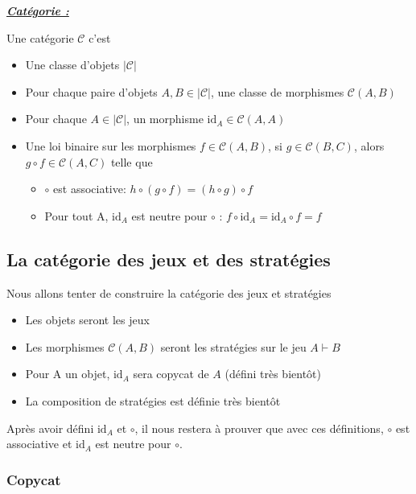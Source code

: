 \documentclass[a4paper,12ptCOUCOU
]{article}
\newlength{\mydepth}
\newlength{\myheight}
\newenvironment{answer}[1]
{\vspace{0.5cm}\begin{minipage}{\linewidth}\textbf{\textit{\underline{#1}}}\par\begin{lrbox}{\mybox}\quad\begin{minipage}{\linewidth}\color{black}\setlength{\parskip}{10pt}}
{\end{minipage}\end{lrbox}
\settodepth{\mydepth}{\usebox{\mybox}}
\settoheight{\myheight}{\usebox{\mybox}}
\addtolength{\myheight}{\mydepth}
\noindent\makebox[0pt]{
  \color{gray}\hspace{-0pt}\rule[-\mydepth]{1pt}{\myheight}}
\usebox{\mybox}
\end{minipage}
  }
\begin{document}
\begin{answer}{Catégorie :}
Une catégorie $\mathcal{C}$ c'est
\begin{itemize}
\item Une classe d'objets $|\mathcal{C}|$

\item Pour chaque paire d'objets $A, B \in |\mathcal{C}|$, une classe de
morphismes $\mathcal{C}(A,B)$

\item Pour chaque $A \in |\mathcal{C}|$, un morphisme
$\text{id}_A \in \mathcal{C}(A,A)$

\item Une loi binaire sur les morphismes
$f \in \mathcal{C}(A,B)$, si $g \in \mathcal{C}(B,C)$, alors
$g \circ f \in \mathcal{C}(A,C)$
telle que
\begin{itemize}
\item $\circ$ est associative:
$h \circ (g \circ f) = (h \circ g) \circ f$

\item Pour tout A, $\text{id}_A$ est neutre pour $\circ$ :
$f \circ \text{id}_A = \text{id}_A \circ f = f$
\end{itemize}
\end{itemize}

\end{answer}

\subsection{La catégorie des jeux et des stratégies}

Nous allons tenter de construire la catégorie des jeux et stratégies

\begin{itemize}
\item Les objets seront les jeux
\item Les morphismes $\mathcal{C}(A,B)$ seront les stratégies sur le jeu $A \vdash B$
\item Pour A un objet, $\text{id}_A$ sera copycat de $A$ (défini très bientôt)
\item La composition de stratégies est définie très bientôt
\end{itemize}

Après avoir défini $\text{id}_A$ et $\circ$, il nous restera à prouver
que avec ces définitions, $\circ$ est associative et $\text{id}_A$ est neutre
pour $\circ$.

\subsubsection{Copycat}
\end{document}
